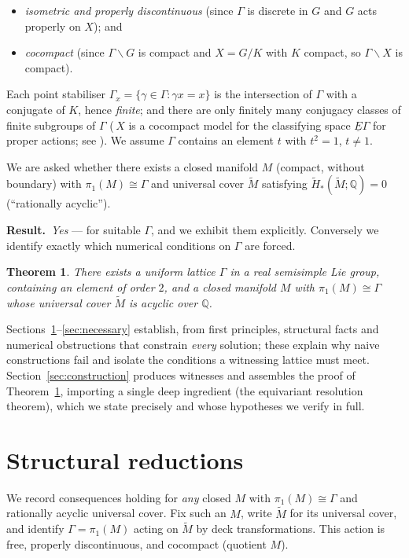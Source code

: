 \documentclass[12pt]{article}
\newcommand{\bQ}{\mathbb{Q}}
\newtheorem{theorem}{Theorem}
\theoremstyle{definition}
\begin{document}
\begin{itemize}
\item \emph{isometric and properly discontinuous} (since $\Gamma$ is discrete in
$G$ and $G$ acts properly on $X$); and
\item \emph{cocompact} (since $\Gamma\backslash G$ is compact and $X=G/K$ with $K$
compact, so $\Gamma\backslash X$ is compact).
\end{itemize}
Each point stabiliser $\Gamma_x=\{\gamma\in\Gamma:\gamma x=x\}$ is the
intersection of $\Gamma$ with a conjugate of $K$, hence \emph{finite}; and there
are only finitely many conjugacy classes of finite subgroups of $\Gamma$
(\,$X$ is a cocompact model for the classifying space $\underline E\Gamma$ for
proper actions; see \cite[\S2]{Lueck}).  We assume $\Gamma$ contains an element
$t$ with $t^2=1$, $t\neq1$.

We are asked whether there exists a closed manifold $M$ (compact, without
boundary) with $\pi_1(M)\cong\Gamma$ and universal cover $\widetilde M$ satisfying
$\widetilde H_*(\widetilde M;\bQ)=0$ (``rationally acyclic'').

\medskip
\noindent\textbf{Result.}\ \emph{Yes} --- for suitable $\Gamma$, and we exhibit
them explicitly.  Conversely we identify exactly which numerical conditions on
$\Gamma$ are forced.

\begin{theorem}\label{thm:main}
There exists a uniform lattice $\Gamma$ in a real semisimple Lie group, containing
an element of order $2$, and a closed manifold $M$ with $\pi_1(M)\cong\Gamma$
whose universal cover $\widetilde M$ is acyclic over $\bQ$.
\end{theorem}

Sections~\ref{sec:reductions}--\ref{sec:necessary} establish, from first
principles, structural facts and numerical obstructions that constrain
\emph{every} solution; these explain why naive constructions fail and isolate the
conditions a witnessing lattice must meet.  Section~\ref{sec:construction}
produces witnesses and assembles the proof of Theorem~\ref{thm:main}, importing a
single deep ingredient (the equivariant resolution theorem), which we state
precisely and whose hypotheses we verify in full.

\section{Structural reductions}\label{sec:reductions}

We record consequences holding for \emph{any} closed $M$ with $\pi_1(M)\cong\Gamma$
and rationally acyclic universal cover.  Fix such an $M$, write $\widetilde M$ for
its universal cover, and identify $\Gamma=\pi_1(M)$ acting on $\widetilde M$ by
deck transformations.  This action is free, properly discontinuous, and cocompact
(quotient $M$).
\end{document}
